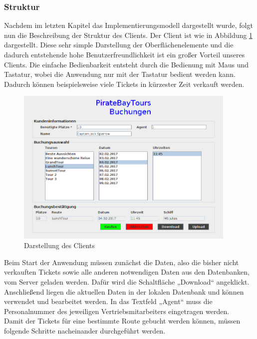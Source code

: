 \documentclass[12pt,a4paper,ngerman,english]{report}
\begin{document}
\subsubsection{Struktur}
Nachdem im letzten Kapitel das Implementierungsmodell dargestellt wurde, folgt nun die Beschreibung der Struktur des Clients. Der Client ist wie in Abbildung \ref{fig:Client} dargestellt. Diese sehr simple Darstellung der Oberflächenelemente und die dadurch entstehende  hohe Benutzerfreundlichkeit ist ein großer Vorteil unseres Clients. Die einfache Bedienbarkeit entsteht durch die Bedienung mit Maus und Tastatur, wobei die Anwendung nur mit der Tastatur bedient werden kann. Dadurch können beispielsweise viele Tickets in kürzester Zeit verkauft werden.
\begin{figure}[h]
  \centering
  \includegraphics[width=0.94\textwidth]{img/Client.png}
  \caption{Darstellung des Clients}
  \label{fig:Client}
\end{figure}
\newpage
Beim Start der Anwendung müssen zunächst die Daten, also die bisher nicht verkauften Tickets sowie alle anderen notwendigen Daten aus den Datenbanken, vom Server geladen werden. Dafür wird die Schaltfläche „Download“ angeklickt. Anschließend liegen die aktuellen Daten in der lokalen Datenbank und können verwendet und bearbeitet werden. In das Textfeld „Agent“ muss die Personalnummer des jeweiligen Vertriebsmitarbeiters eingetragen werden.\\
Damit der Tickets für eine bestimmte Route gebucht werden können, müssen folgende Schritte nacheinander durchgeführt werden.
\end{document}

